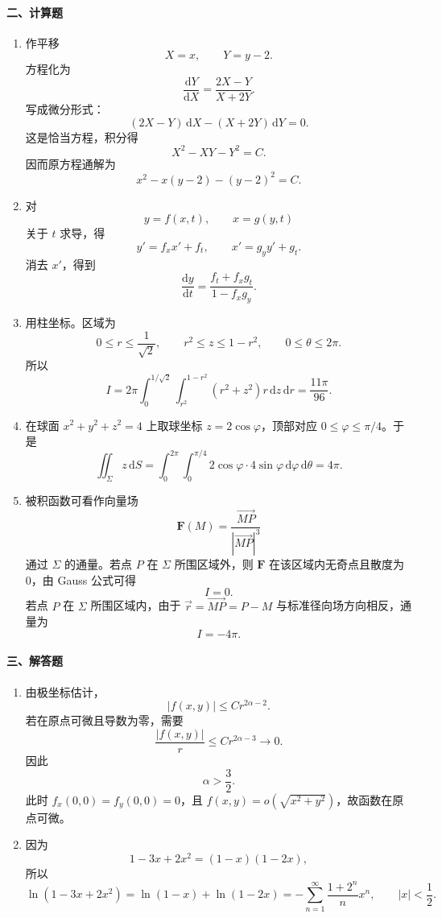 \paragraph*{二、计算题}
\begin{enumerate}
  \item 作平移
  \[
    X=x,\qquad Y=y-2.
  \]
  方程化为
  \[
    \frac{\mathrm{d}Y}{\mathrm{d}X}=\frac{2X-Y}{X+2Y}.
  \]
  写成微分形式：
  \[
    (2X-Y)\,\mathrm{d}X-(X+2Y)\,\mathrm{d}Y=0.
  \]
  这是恰当方程，积分得
  \[
    X^2-XY-Y^2=C.
  \]
  因而原方程通解为
  \[
    x^2-x(y-2)-(y-2)^2=C.
  \]

  \item 对
  \[
    y=f(x,t),\qquad x=g(y,t)
  \]
  关于 \(t\) 求导，得
  \[
    y'=f_xx'+f_t,\qquad x'=g_yy'+g_t.
  \]
  消去 \(x'\)，得到
  \[
    \frac{\mathrm{d}y}{\mathrm{d}t}
    =\frac{f_t+f_xg_t}{1-f_xg_y}.
  \]

  \item 用柱坐标。区域为
  \[
    0\le r\le \frac1{\sqrt2},\qquad r^2\le z\le 1-r^2,\qquad 0\le\theta\le2\pi.
  \]
  所以
  \[
    I=2\pi\int_0^{1/\sqrt2}\int_{r^2}^{1-r^2}(r^2+z^2)r\,\mathrm{d}z\,\mathrm{d}r
    =\frac{11\pi}{96}.
  \]

  \item 在球面 \(x^2+y^2+z^2=4\) 上取球坐标 \(z=2\cos\varphi\)，顶部对应
  \(0\le\varphi\le\pi/4\)。于是
  \[
    \iint_\Sigma z\,\mathrm{d}S
    =\int_0^{2\pi}\int_0^{\pi/4}2\cos\varphi\cdot4\sin\varphi\,\mathrm{d}\varphi\,\mathrm{d}\theta
    =4\pi.
  \]

  \item 被积函数可看作向量场
  \[
    \mathbf F(M)=\frac{\overrightarrow{MP}}{|\overrightarrow{MP}|^3}
  \]
  通过 \(\Sigma\) 的通量。若点 \(P\) 在 \(\Sigma\) 所围区域外，则 \(\mathbf F\) 在该区域内无奇点且散度为 \(0\)，由 Gauss 公式可得
  \[
    I=0.
  \]
  若点 \(P\) 在 \(\Sigma\) 所围区域内，由于 \(\vec r=\overrightarrow{MP}=P-M\) 与标准径向场方向相反，通量为
  \[
    I=-4\pi.
  \]
\end{enumerate}

\paragraph*{三、解答题}
\begin{enumerate}
  \item 由极坐标估计，
  \[
    |f(x,y)|\le C r^{2\alpha-2}.
  \]
  若在原点可微且导数为零，需要
  \[
    \frac{|f(x,y)|}{r}\le C r^{2\alpha-3}\to0.
  \]
  因此
  \[
    \alpha>\frac32.
  \]
  此时 \(f_x(0,0)=f_y(0,0)=0\)，且 \(f(x,y)=o(\sqrt{x^2+y^2})\)，故函数在原点可微。

  \item 因为
  \[
    1-3x+2x^2=(1-x)(1-2x),
  \]
  所以
  \[
    \ln(1-3x+2x^2)=\ln(1-x)+\ln(1-2x)
    =-\sum_{n=1}^{\infty}\frac{1+2^n}{n}x^n,\qquad |x|<\frac12.
  \]
\end{enumerate}


